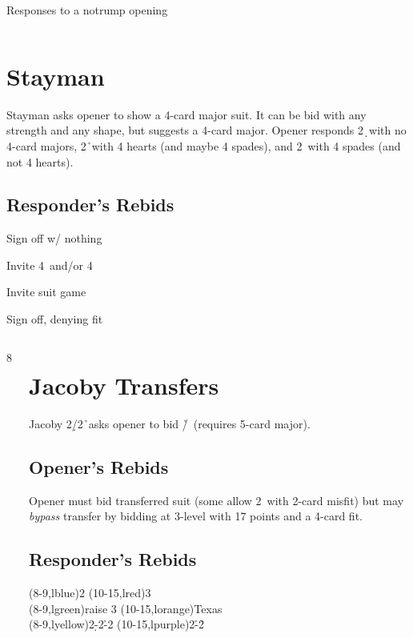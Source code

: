 \begin{sheet}{Responses to a notrump opening}
\begin{columns}{3}
\begin{column}
\section{Stayman}
Stayman asks opener to show a 4-card major suit.  It can be bid with
any strength and any shape, but suggests a 4-card major.  Opener responds
2\d\ with no 4-card majors, 2\h\ with 4 hearts (and maybe 4 spades),
and 2\s\ with 4 spades (and not 4 hearts).
\subsection{Responder's Rebids}
\begin{description}\itemsep-4pt
\item[\pass/2\h]Sign off w/ nothing
\item[2\s/2\nt]Invite 4\s\ and/or 4\nt
\item[raise to 3]Invite suit game
\item[3\nt]Sign off, denying fit
\end{description}
\end{column}

\end{columns}

\vskip-8pt


\begin{columns}8
\begin{column}[span=5]
\section{Jacoby Transfers}
Jacoby 2\d/2\h\ asks opener to bid \h/\s\ (requires 5-card major).
\subsection{Opener's Rebids}
Opener must bid transferred suit (some allow 2\nt\ with 2-card misfit) but may
\emph{bypass} transfer by bidding at 3-level with 17 points and a 4-card fit.
\subsection{Responder's Rebids}
\vskip-26pt
{\strut\hfill
\begin{ptable}
  \bid(8-9,lblue){2\nt}
  \bid(10-15,lred){3\nt}\\
  \bid(8-9,lgreen){raise 3}
  \bid(10-15,lorange){Texas}\\
  \bid(8-9,lyellow){2\d-2\h-2\s}
  \bid(10-15,lpurple){2\h-2\h}\\
\end{ptable}\strut}
\strut\vskip-24pt\strut

\end{column}
\end{columns}
\end{sheet}
